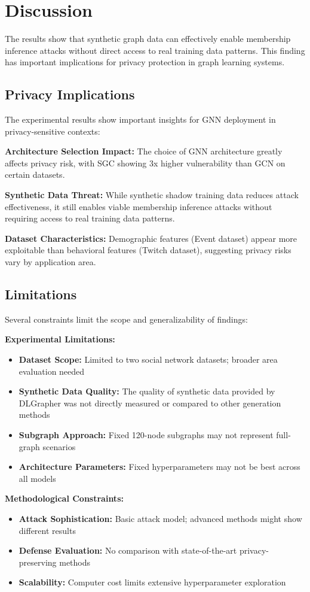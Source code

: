 \documentclass{article}
\begin{document}
\section{Discussion}
The results show that synthetic graph data can effectively enable membership inference attacks without direct access to real training data patterns. This finding has important implications for privacy protection in graph learning systems.

\subsection{Privacy Implications}
The experimental results show important insights for GNN deployment in privacy-sensitive contexts:

\textbf{Architecture Selection Impact:} The choice of GNN architecture greatly affects privacy risk, with SGC showing 3x higher vulnerability than GCN on certain datasets.

\textbf{Synthetic Data Threat:} While synthetic shadow training data reduces attack effectiveness, it still enables viable membership inference attacks without requiring access to real training data patterns.

\textbf{Dataset Characteristics:} Demographic features (Event dataset) appear more exploitable than behavioral features (Twitch dataset), suggesting privacy risks vary by application area.


\subsection{Limitations}
Several constraints limit the scope and generalizability of findings:

\textbf{Experimental Limitations:}
\begin{itemize}
\item \textbf{Dataset Scope:} Limited to two social network datasets; broader area evaluation needed
\item \textbf{Synthetic Data Quality:} The quality of synthetic data provided by DLGrapher was not directly measured or compared to other generation methods
\item \textbf{Subgraph Approach:} Fixed 120-node subgraphs may not represent full-graph scenarios
\item \textbf{Architecture Parameters:} Fixed hyperparameters may not be best across all models
\end{itemize}

\textbf{Methodological Constraints:}
\begin{itemize}
\item \textbf{Attack Sophistication:} Basic attack model; advanced methods might show different results
\item \textbf{Defense Evaluation:} No comparison with state-of-the-art privacy-preserving methods
\item \textbf{Scalability:} Computer cost limits extensive hyperparameter exploration
\end{itemize}
\end{document}

